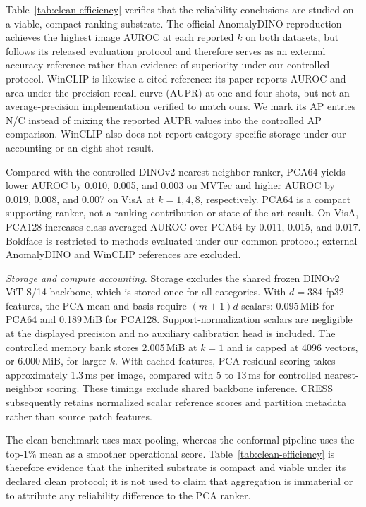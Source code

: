 Table~\ref{tab:clean-efficiency} verifies that the reliability conclusions are studied on a viable, compact ranking substrate. The official AnomalyDINO reproduction achieves the highest image AUROC at each reported $k$ on both datasets, but follows its released evaluation protocol and therefore serves as an external accuracy reference rather than evidence of superiority under our controlled protocol. WinCLIP is likewise a cited reference: its paper reports AUROC and area under the precision-recall curve (AUPR) at one and four shots, but not an average-precision implementation verified to match ours. We mark its AP entries N/C instead of mixing the reported AUPR values into the controlled AP comparison. WinCLIP also does not report category-specific storage under our accounting or an eight-shot result.

Compared with the controlled DINOv2 nearest-neighbor ranker, PCA64 yields lower AUROC by 0.010, 0.005, and 0.003 on MVTec and higher AUROC by 0.019, 0.008, and 0.007 on VisA at $k=1,4,8$, respectively. PCA64 is a compact supporting ranker, not a ranking contribution or state-of-the-art result. On VisA, PCA128 increases class-averaged AUROC over PCA64 by 0.011, 0.015, and 0.017. Boldface is restricted to methods evaluated under our common protocol; external AnomalyDINO and WinCLIP references are excluded.

\emph{Storage and compute accounting.} Storage excludes the shared frozen DINOv2 ViT-S/14 backbone, which is stored once for all categories. With $d=384$ fp32 features, the PCA mean and basis require $(m+1)d$ scalars: 0.095\,MiB for PCA64 and 0.189\,MiB for PCA128. Support-normalization scalars are negligible at the displayed precision and no auxiliary calibration head is included. The controlled memory bank stores 2.005\,MiB at $k=1$ and is capped at 4096 vectors, or 6.000\,MiB, for larger $k$. With cached features, PCA-residual scoring takes approximately 1.3\,ms per image, compared with 5 to 13\,ms for controlled nearest-neighbor scoring. These timings exclude shared backbone inference. CRESS subsequently retains normalized scalar reference scores and partition metadata rather than source patch features.

The clean benchmark uses max pooling, whereas the conformal pipeline uses the top-$1\%$ mean as a smoother operational score. Table~\ref{tab:clean-efficiency} is therefore evidence that the inherited substrate is compact and viable under its declared clean protocol; it is not used to claim that aggregation is immaterial or to attribute any reliability difference to the PCA ranker.
